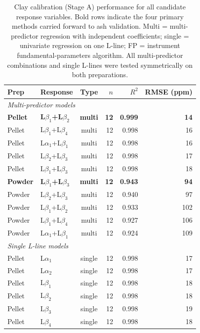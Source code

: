 \documentclass[journal=esthag,manuscript=suppinfo]{achemso}
\begin{document}
\begin{table}[htbp]
\caption{Clay calibration (Stage A) performance for all candidate response variables. Bold rows indicate the four primary methods carried forward to ash validation. Multi = multi-predictor regression with independent coefficients; single = univariate regression on one L-line; FP = instrument fundamental-parameters algorithm. All multi-predictor combinations and single L-lines were tested symmetrically on both preparations.}
\label{tab:clay_calibration}
\centering
\footnotesize
\begin{tabular}{llcrrr}
\toprule
Prep & Response & Type & $n$ & $R^2$ & RMSE (ppm) \\
\midrule
\multicolumn{6}{l}{\textit{Multi-predictor models}} \\
\textbf{Pellet} & \textbf{L$\beta_1$+L$\beta_2$} & \textbf{multi} & \textbf{12} & \textbf{0.999} & \textbf{14} \\
Pellet & L$\beta_1$+L$\beta_4$ & multi & 12 & 0.998 & 16 \\
Pellet & L$\alpha_1$+L$\beta_1$ & multi & 12 & 0.998 & 16 \\
Pellet & L$\beta_2$+L$\beta_3$ & multi & 12 & 0.998 & 17 \\
Pellet & L$\beta_1$+L$\beta_3$ & multi & 12 & 0.998 & 18 \\
\textbf{Powder} & \textbf{L$\beta_1$+L$\beta_3$} & \textbf{multi} & \textbf{12} & \textbf{0.943} & \textbf{94} \\
Powder & L$\beta_2$+L$\beta_3$ & multi & 12 & 0.940 & 97 \\
Powder & L$\beta_1$+L$\beta_2$ & multi & 12 & 0.933 & 102 \\
Powder & L$\beta_1$+L$\beta_4$ & multi & 12 & 0.927 & 106 \\
Powder & L$\alpha_1$+L$\beta_1$ & multi & 12 & 0.924 & 109 \\
\midrule
\multicolumn{6}{l}{\textit{Single L-line models}} \\
Pellet & L$\alpha_1$          & single & 12 & 0.998 & 17 \\
Pellet & L$\alpha_2$          & single & 12 & 0.998 & 17 \\
Pellet & L$\beta_1$           & single & 12 & 0.998 & 18 \\
Pellet & L$\beta_2$           & single & 12 & 0.998 & 18 \\
Pellet & L$\beta_3$           & single & 12 & 0.998 & 19 \\
Pellet & L$\beta_4$           & single & 12 & 0.998 & 18 \\

\end{tabular}
\end{table}
\end{document}
